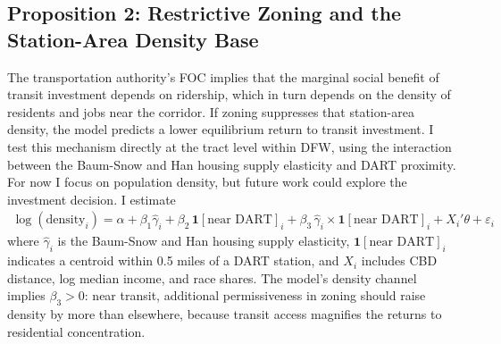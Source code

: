 \documentclass[12pt, a4paper]{article}
\theoremstyle{definition}
\begin{document}
\subsection{Proposition 2: Restrictive Zoning and the Station-Area Density Base}

The transportation authority's FOC implies that the marginal social benefit of transit investment depends on ridership, which in turn depends on the density of residents and jobs near the corridor. If zoning suppresses that station-area density, the model predicts a lower equilibrium return to transit investment. I test this mechanism directly at the tract level within DFW, using the interaction between the Baum-Snow and Han housing supply elasticity and DART proximity.  For now I focus on population density, but future work could explore the investment decision.
I estimate
\begin{align}
\log(\text{density}_i)
= \alpha
+ \beta_1 \hat\gamma_i
+ \beta_2\,\mathbf{1}[\text{near DART}]_i
+ \beta_3\,\hat\gamma_i \times \mathbf{1}[\text{near DART}]_i
+ X_i'\theta
+ \varepsilon_i
\label{eq:p2spec}
\end{align}
where $\hat\gamma_i$ is the Baum-Snow and Han housing supply elasticity, $\mathbf{1}[\text{near DART}]_i$ indicates a centroid within 0.5 miles of a DART station, and $X_i$ includes CBD distance, log median income, and race shares. The model's density channel implies $\beta_3 > 0$: near transit, additional permissiveness in zoning should raise density by more than elsewhere, because transit access magnifies the returns to residential concentration.
\end{document}
